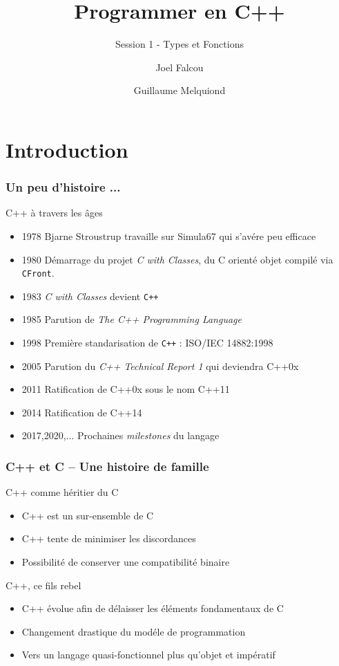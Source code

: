 \documentclass[svgnames]{beamer}
\title{Programmer en C++}
\subtitle{Session 1 - Types et Fonctions}
\author{Joel Falcou \and Guillaume Melquiond}
\institute{Laboratoire de Recherche en Informatique}
\date{}
\begin{document}


\begin{frame}[plain]
\titlepage
\end{frame}
\setcounter{framenumber}{0}

\section{Introduction}
\frame
{
  \frametitle{Un peu d'histoire ...}
  \begin{block}{C++ \`a travers les \^ages}
  \begin{itemize}
  \footnotesize
  \item 1978 Bjarne Stroustrup travaille sur Simula67 qui s'av\'ere peu efficace
  \item 1980 D\'emarrage du projet \textit{C with Classes}, du C orient\'e objet compil\'e via \texttt{CFront}.
  \item 1983 \textit{C with Classes} devient \texttt{C++}
  \item 1985 Parution de \textit{The C++ Programming Language}
  \item 1998 Premi\`ere standarisation de \texttt{C++} : ISO/IEC 14882:1998
  \item 2005 Parution du \textit{C++ Technical Report 1} qui deviendra C++0x
  \item 2011 Ratification de C++0x sous le nom C++11
  \item 2014 Ratification de C++14
  \item 2017,2020,... Prochaines \textit{milestones} du langage
  \end{itemize}
  \end{block}
}

\frame
{
  \frametitle{C++ et C -- Une histoire de famille}
  \begin{block}{C++ comme h\'eritier du C}
  \begin{itemize}
  \item C++ est un sur-ensemble de C
  \item C++ tente de minimiser les discordances
  \item Possibilit\'e de conserver une compatibilit\'e binaire
  \end{itemize}
  \end{block}

  \begin{block}{C++, ce fils rebel}
  \begin{itemize}
  \item C++ \'evolue afin de d\'elaisser les \'el\'ements fondamentaux de C
  \item Changement drastique du mod\'ele de programmation
  \item Vers un langage quasi-fonctionnel plus qu'objet et imp\'eratif
  \end{itemize}
  \end{block}
}
\end{document}
